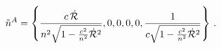 \begin{equation}\label{ntilde}
\tilde n^A = \left\{ {{c \, \dot{\cal R}}\over {n^2
\sqrt{1-{{c^2}\over{n^2}} \dot{\cal R}^2}}},0,0,0,0,{1 \over
{c\sqrt{1-{{c^2}\over{n^2}} \dot{\cal R}^2 }}} \right\} \,. 
\end{equation}

